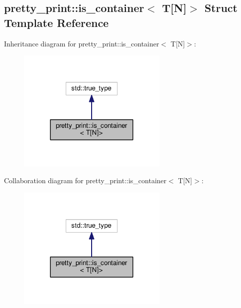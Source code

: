\hypertarget{structpretty__print_1_1is__container_3_01T[N]_4}{}\subsection{pretty\+\_\+print\+:\+:is\+\_\+container$<$ T\mbox{[}N\mbox{]}$>$ Struct Template Reference}
\label{structpretty__print_1_1is__container_3_01T[N]_4}


Inheritance diagram for pretty\+\_\+print\+:\+:is\+\_\+container$<$ T\mbox{[}N\mbox{]}$>$\+:
\nopagebreak
\begin{figure}[H]
\begin{center}
\leavevmode
\includegraphics[width=204pt]{structpretty__print_1_1is__container_3_01T[N]_4__inherit__graph}
\end{center}
\end{figure}


Collaboration diagram for pretty\+\_\+print\+:\+:is\+\_\+container$<$ T\mbox{[}N\mbox{]}$>$\+:
\nopagebreak
\begin{figure}[H]
\begin{center}
\leavevmode
\includegraphics[width=204pt]{structpretty__print_1_1is__container_3_01T[N]_4__coll__graph}
\end{center}
\end{figure}


